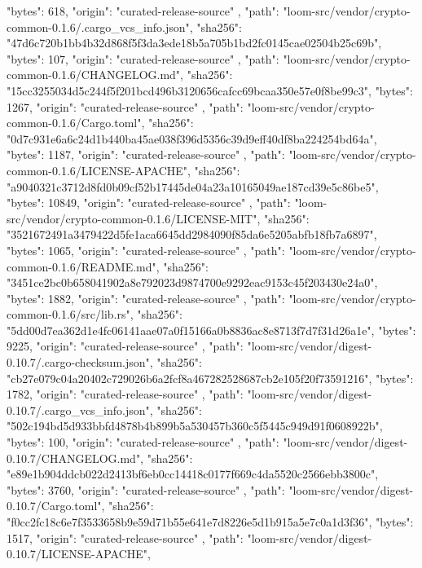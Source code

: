 {{      "bytes": 618,
      "origin": "curated-release-source"
    },
    {
      "path": "loom-src/vendor/crypto-common-0.1.6/.cargo_vcs_info.json",
      "sha256": "47d6c720b1bb4b32d868f5f3da3ede18b5a705b1bd2fc0145cae02504b25c69b",
      "bytes": 107,
      "origin": "curated-release-source"
    },
    {
      "path": "loom-src/vendor/crypto-common-0.1.6/CHANGELOG.md",
      "sha256": "15cc3255034d5c244f5f201bcd496b3120656cafcc69bcaa350e57e0f8be99c3",
      "bytes": 1267,
      "origin": "curated-release-source"
    },
    {
      "path": "loom-src/vendor/crypto-common-0.1.6/Cargo.toml",
      "sha256": "0d7c931e6a6c24d1b440ba45ae038f396d5356c39d9eff40df8ba224254bd64a",
      "bytes": 1187,
      "origin": "curated-release-source"
    },
    {
      "path": "loom-src/vendor/crypto-common-0.1.6/LICENSE-APACHE",
      "sha256": "a9040321c3712d8fd0b09cf52b17445de04a23a10165049ae187cd39e5c86be5",
      "bytes": 10849,
      "origin": "curated-release-source"
    },
    {
      "path": "loom-src/vendor/crypto-common-0.1.6/LICENSE-MIT",
      "sha256": "3521672491a3479422d5fe1aca6645dd2984090f85da6e5205abfb18fb7a6897",
      "bytes": 1065,
      "origin": "curated-release-source"
    },
    {
      "path": "loom-src/vendor/crypto-common-0.1.6/README.md",
      "sha256": "3451ce2bc0b658041902a8e792023d9874700e9292eac9153c45f203430e24a0",
      "bytes": 1882,
      "origin": "curated-release-source"
    },
    {
      "path": "loom-src/vendor/crypto-common-0.1.6/src/lib.rs",
      "sha256": "5dd00d7ea362d1e4fc06141aae07a0f15166a0b8836ac8e8713f7d7f31d26a1e",
      "bytes": 9225,
      "origin": "curated-release-source"
    },
    {
      "path": "loom-src/vendor/digest-0.10.7/.cargo-checksum.json",
      "sha256": "cb27e079c04a20402c729026b6a2fcf8a467282528687cb2e105f20f73591216",
      "bytes": 1782,
      "origin": "curated-release-source"
    },
    {
      "path": "loom-src/vendor/digest-0.10.7/.cargo_vcs_info.json",
      "sha256": "502c194bd5d933bbfd4878b4b899b5a530457b360c5f5445c949d91f0608922b",
      "bytes": 100,
      "origin": "curated-release-source"
    },
    {
      "path": "loom-src/vendor/digest-0.10.7/CHANGELOG.md",
      "sha256": "e89e1b904ddcb022d2413bf6eb0cc14418c0177f669c4da5520c2566ebb3800c",
      "bytes": 3760,
      "origin": "curated-release-source"
    },
    {
      "path": "loom-src/vendor/digest-0.10.7/Cargo.toml",
      "sha256": "f0cc2fc18c6e7f3533658b9e59d71b55e641e7d8226e5d1b915a5e7c0a1d3f36",
      "bytes": 1517,
      "origin": "curated-release-source"
    },
    {
      "path": "loom-src/vendor/digest-0.10.7/LICENSE-APACHE",
}}
